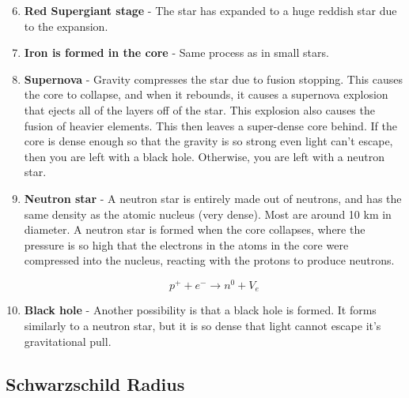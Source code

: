 \documentclass[a4paper, 12pt]{article}
\begin{document}
\begin{enumerate}
	\setcounter{enumi}{5}

	\item \textbf{Red Supergiant stage} - The star has expanded to a huge reddish star due to the expansion.

	\item \textbf{Iron is formed in the core} - Same process as in small stars.

	\item \textbf{Supernova} - Gravity compresses the star due to fusion stopping. This causes the core to collapse, and when it rebounds, it causes a supernova explosion that ejects all of the layers off of the star. This explosion also causes the fusion of heavier elements. This then leaves a super-dense core behind. If the core is dense enough so that the gravity is so strong even light can't escape, then you are left with a black hole. Otherwise, you are left with a neutron star.

	\item {\textbf{Neutron star} - A neutron star is entirely made out of neutrons, and has the same density as the atomic nucleus (very dense). Most are around 10 km in diameter. A neutron star is formed when the core collapses, where the pressure is so high that the electrons in the atoms in the core were compressed into the nucleus, reacting with the protons to produce neutrons.
	
	$$
	p^+ + e^- \rightarrow n^0 + V_e
	$$}

	\item \textbf{Black hole} - Another possibility is that a black hole is formed. It forms similarly to a neutron star, but it is so dense that light cannot escape it's gravitational pull.

\end{enumerate}

\subsection{Schwarzschild Radius}
\end{document}

